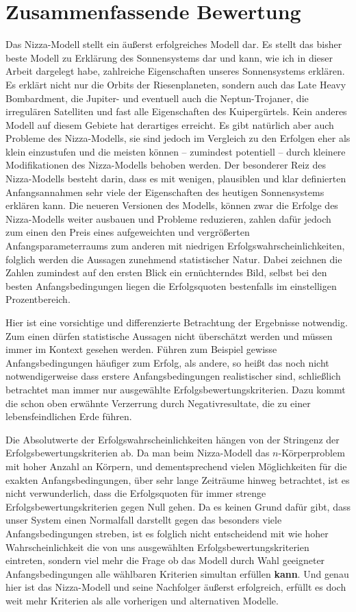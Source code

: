 \documentclass[12pt,a4paper,twoside,open=right,bibliography=totoc]{scrbook}
\begin{document}
\chapter{Zusammenfassende Bewertung}
Das Nizza-Modell stellt ein äußerst erfolgreiches Modell dar. Es stellt das bisher beste Modell zu Erklärung des Sonnensystems dar und kann, wie ich in dieser Arbeit dargelegt habe, zahlreiche Eigenschaften unseres Sonnensystems erklären.
Es erklärt nicht nur die Orbits der Riesenplaneten, sondern auch das Late Heavy Bombardment, die Jupiter- und eventuell auch die Neptun-Trojaner, die irregulären Satelliten und fast alle Eigenschaften des Kuipergürtels.
Kein anderes Modell auf diesem Gebiete hat derartiges erreicht.
Es gibt natürlich aber auch Probleme des Nizza-Modells, sie sind jedoch im Vergleich zu den Erfolgen eher als klein einzustufen und die meisten können -- zumindest potentiell -- durch kleinere Modifikationen des Nizza-Modells behoben werden.
Der besonderer Reiz des Nizza-Modells besteht darin, dass es mit wenigen, plausiblen und klar definierten Anfangsannahmen sehr viele der Eigenschaften des heutigen Sonnensystems erklären kann.
Die neueren Versionen des Modells, können zwar die Erfolge des Nizza-Modells weiter ausbauen und Probleme reduzieren, zahlen dafür jedoch zum einen den Preis eines aufgeweichten und vergrößerten Anfangsparameterraums zum anderen mit niedrigen Erfolgswahrscheinlichkeiten, folglich werden die Aussagen zunehmend statistischer Natur. Dabei zeichnen die Zahlen zumindest auf den ersten Blick ein ernüchterndes Bild, selbst bei den besten Anfangsbedingungen liegen die Erfolgsquoten bestenfalls im einstelligen Prozentbereich.

Hier ist eine vorsichtige und differenzierte Betrachtung der Ergebnisse notwendig. Zum einen dürfen statistische Aussagen nicht überschätzt werden und müssen immer im Kontext gesehen werden. Führen zum Beispiel gewisse Anfangsbedingungen häufiger zum Erfolg, als andere, so heißt das noch nicht notwendigerweise dass erstere Anfangsbedingungen realistischer sind, schließlich betrachtet man immer nur ausgewählte Erfolgsbewertungskriterien. Dazu kommt die schon oben erwähnte Verzerrung durch Negativresultate, die zu einer lebensfeindlichen Erde führen.

Die Absolutwerte der Erfolgswahrscheinlichkeiten hängen von der Stringenz der Erfolgsbewertungskriterien ab. Da man beim Nizza-Modell das $n$-Körperproblem mit hoher Anzahl an Körpern, und dementsprechend vielen Möglichkeiten für die exakten Anfangsbedingungen, über sehr lange Zeiträume hinweg betrachtet, ist es nicht verwunderlich, dass die Erfolgsquoten für immer strenge Erfolgsbewertungskriterien gegen Null gehen.
Da es keinen Grund dafür gibt, dass unser System einen Normalfall darstellt gegen das besonders viele Anfangsbedingungen streben, ist es folglich nicht entscheidend mit wie hoher Wahrscheinlichkeit die von uns ausgewählten Erfolgsbewertungskriterien eintreten, sondern viel mehr die Frage ob das Modell durch Wahl geeigneter Anfangsbedingungen alle wählbaren Kriterien simultan erfüllen \textbf{kann}.
Und genau hier ist das Nizza-Modell und seine Nachfolger äußerst erfolgreich, erfüllt es doch weit mehr Kriterien als alle vorherigen und alternativen Modelle.
\end{document}
